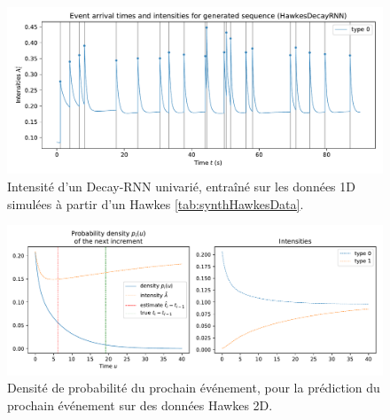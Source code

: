 \documentclass[../main.tex]{subfiles}
\begin{document}
\begin{figure}[ht]
	\includegraphics[width=\linewidth]{../results/intensity_HawkesDecayRNN_1d_hidden64_20181206-234848.pdf}
	\caption{Intensité d'un Decay-RNN univarié, entraîné sur les données 1D simulées à partir d'un Hawkes \autoref{tab:synthHawkesData}.}\label{fig:1DRNNintensityPlot}
\end{figure}

\begin{figure}[!ht]
	\includegraphics[width=\linewidth]{../notebooks/lstm_2d_prediction_graphs.pdf}
	\caption{Densité de probabilité du prochain événement, pour la prédiction du prochain événement sur des données Hawkes 2D.}
\end{figure}
\end{document}
